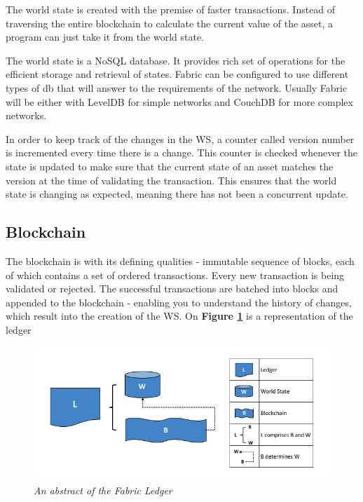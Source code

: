 \documentclass[a4paper,11pt]{report}
\begin{document}
The world state is created with the premise of faster transactions. Instead of traversing the entire blockchain to calculate the current value of the asset, a program can just take it from the world state.

The world state is a NoSQL database. It provides rich set of operations for the efficient storage and retrieval of states. Fabric can be configured to use different types of db that will answer to the requirements of the network. Usually Fabric will be either with LevelDB for simple networks and CouchDB for more complex networks.

In order to keep track of the changes in the WS, a counter called version number is incremented every time there is a change. This counter is checked whenever the state is updated to make sure that the current state of an asset matches the version at the time of validating the transaction. This ensures that the world state is changing as expected, meaning there has not been a concurrent update. \cite{fabledger}

\subsection{Blockchain}

The blockchain is with its defining qualities - immutable sequence of blocks, each of which contains a set of ordered transactions. Every new transaction is being validated or rejected. The successful transactions are batched into blocks and appended to the blockchain - enabling you to understand the history of changes, which result into the creation of the WS. On \textbf{Figure \ref{fabricLedger}} is a representation of the ledger

\begin{figure}[h]
\centering
  \includegraphics[width=16cm]{ledgerdiagram1.png}
  \caption{\textit{An abstract of the Fabric Ledger \cite{fabledger}}}
  \label{fabricLedger}
\end{figure}
\end{document}

